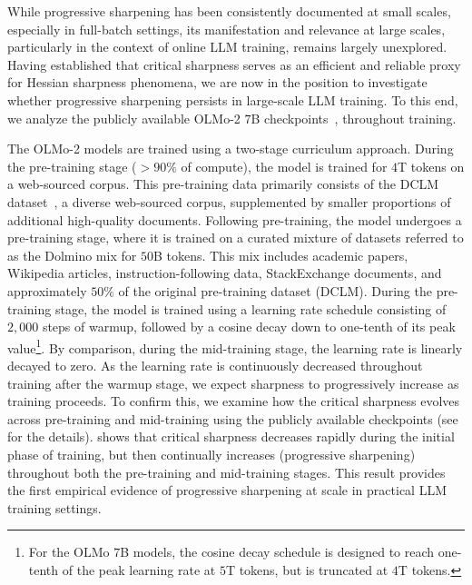 \documentclass[]{fairmeta}
\theoremstyle{plain}
\theoremstyle{definition}
\begin{document}
While progressive sharpening has been consistently documented at small scales, especially in full-batch settings, its manifestation and relevance at large scales, particularly in the context of online LLM training, remains largely unexplored. Having established that critical sharpness serves as an efficient and reliable proxy for Hessian sharpness phenomena, we are now in the position to investigate whether progressive sharpening persists in large-scale LLM training.
%
To this end, we analyze the publicly available OLMo-2 $7$B checkpoints~\citep{walsh2025}, throughout training. 

The OLMo-2 models are trained using a two-stage curriculum approach. During the pre-training stage ($>90\%$ of compute), the model is trained for $4$T tokens on a web-sourced corpus. This pre-training data primarily consists of the DCLM dataset~\citep{li2025datacomplmsearchgenerationtraining},  a diverse web-sourced corpus, supplemented by smaller proportions of additional high-quality documents.
Following pre-training, the model undergoes a pre-training stage, where it is trained on a curated mixture of datasets referred to as the Dolmino mix for $50$B tokens.
This mix includes academic papers, Wikipedia articles, instruction-following data, StackExchange documents, and approximately $50\%$ of the original pre-training dataset (DCLM).
%
During the pre-training stage, the model is trained using a learning rate schedule consisting of $2,000$ steps of warmup, followed by a cosine decay down to one-tenth of its peak value\footnote{For the OLMo $7$B models, the cosine decay schedule is designed to reach one-tenth of the peak learning rate at $5$T tokens, but is truncated at $4$T tokens.}. By comparison, during the mid-training stage, the learning rate is linearly decayed to zero. As the learning rate is continuously decreased throughout training after the warmup stage, we expect sharpness to progressively increase as training proceeds.
To confirm this, we examine how the critical sharpness evolves across pre-training and mid-training using the publicly available checkpoints (see  for the details).
 shows that critical sharpness decreases rapidly during the initial phase of training, but then continually increases (progressive sharpening) throughout both the pre-training and mid-training stages. This result provides the first empirical evidence of progressive sharpening at scale in practical LLM training settings.
\end{document}
